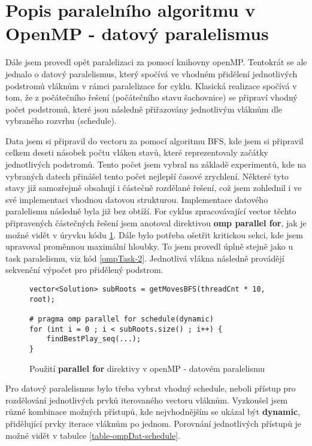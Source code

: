 \documentclass{article} \oddsidemargin=-5mm
\begin{document}

\section{Popis paralelního algoritmu v OpenMP - datový paralelismus}
\label{openMp-Dat-sec}

Dále jsem provedl opět paralelizaci za pomocí knihovny openMP. Tentokrát se ale jednalo o datový paralelismus, který spočívá ve vhodném přidělení jednotlivých podstromů vláknům v rámci paralelizace for cyklu. Klasická realizace spočívá v tom, že z počátečního řešení (počátečního stavu šachovnice) se připraví vhodný počet podstromů, které jsou následně přiřazovány jednotlivým vláknům dle vybraného rozvrhu (schedule).

Data jsem si připravil do vectoru za pomocí algoritmu BFS, kde jsem si připravil celkem deseti násobek počtu vláken stavů, které reprezentovaly začátky jednotlivých podstromů. Tento počet jsem vybral na základě experimentů, kde na vybraných datech přinášel tento počet nejlepší časové zrychlení. Některé tyto stavy již samozřejmě obsahují i částečně rozdělané řešení, což jsem zohlednil i ve své implementaci vhodnou datovou strukturou. Implementace datového paralelismu následně byla již bez obtíží. For cyklus zpracovávající vector těchto připravených částečných řešení jsem anotoval direktivou \textbf{omp parallel for}, jak je možné vidět v úryvku kódu \ref{ompDat-1}. Dále bylo potřeba ošetřit kritickou sekci, kde jsem upravoval proměnnou maximální hloubky. To jsem provedl úplně stejně jako u task paralelismu, viz kód \ref{ompTask-2}. Jednotlivá vlákna následně provádějí sekvenční výpočet pro přidělený podstrom.

\begin{figure}[h]
\centering
\begin{BVerbatim}
vector<Solution> subRoots = getMovesBFS(threadCnt * 10, root);

# pragma omp parallel for schedule(dynamic)
for (int i = 0 ; i < subRoots.size() ; i++) {
    findBestPlay_seq(...);
}
\end{BVerbatim}
\caption{Použití \textbf{parallel for} direktivy v openMP - datovém paralelismu}
\label{ompDat-1}
\end{figure}

Pro datový paralelismus bylo třeba vybrat vhodný schedule, neboli přístup pro rozdělování jednotlivých prvků iterovaného vectoru vláknům. Vyzkoušel jsem různé kombinace možných přístupů, kde nejvhodnějším se ukázal být \textbf{dynamic}, přidělující prvky iterace vláknům po jednom. Porovnání jednotlivých přístupů je možné vidět v tabulce \ref{table-ompDat-schedule}.
\end{document}
